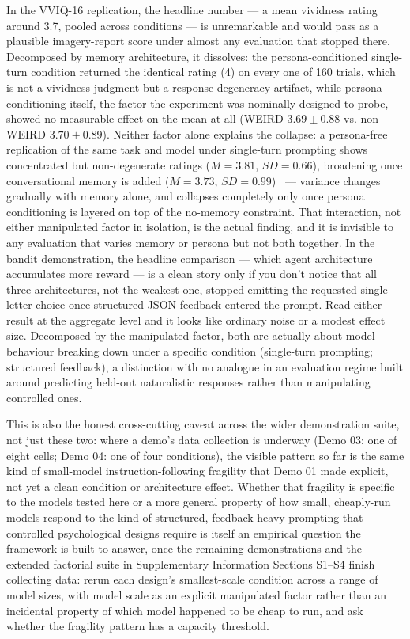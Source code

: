 \documentclass[11pt]{article}
\begin{document}
In the VVIQ-16 replication, the headline number — a mean vividness rating
around 3.7, pooled across conditions — is unremarkable and would pass as a
plausible imagery-report score under almost any evaluation that stopped
there. Decomposed by memory architecture, it dissolves: the
persona-conditioned single-turn condition returned the identical rating
(4) on every one of 160 trials, which is not a vividness judgment but a
response-degeneracy artifact, while persona conditioning itself, the
factor the experiment was nominally designed to probe, showed no
measurable effect on the mean at all (WEIRD $3.69\pm0.88$ vs.
non-WEIRD $3.70\pm0.89$). Neither factor alone explains the collapse: a
persona-free replication of the same task and model under single-turn
prompting shows concentrated but non-degenerate ratings
($M=3.81$, $SD=0.66$), broadening once conversational memory is added
($M=3.73$, $SD=0.99$)~\citep{ranjan2025psychological} — variance changes
gradually with memory alone, and collapses completely only once persona
conditioning is layered on top of the no-memory constraint. That
interaction, not either manipulated factor in isolation, is the actual
finding, and it is invisible to any evaluation that varies memory or
persona but not both together. In the bandit demonstration, the headline
comparison — which agent architecture accumulates more reward — is a clean
story only if you don't notice that all three architectures, not the
weakest one, stopped emitting the requested single-letter choice once
structured JSON feedback entered the prompt. Read either result at the
aggregate level and it looks like ordinary noise or a modest effect size.
Decomposed by the manipulated factor, both are actually about model
behaviour breaking down under a specific condition (single-turn prompting;
structured feedback), a distinction with no analogue in an evaluation
regime built around predicting held-out naturalistic responses rather than
manipulating controlled ones.

This is also the honest cross-cutting caveat across the wider demonstration
suite, not just these two: where a demo's data collection is underway
(Demo 03: one of eight cells; Demo 04: one of four conditions), the visible
pattern so far is the same kind of small-model instruction-following
fragility that Demo 01 made explicit, not yet a clean condition or
architecture effect. Whether that fragility is specific to the models
tested here or a more general property of how small, cheaply-run models
respond to the kind of structured, feedback-heavy prompting that
controlled psychological designs require is itself an empirical question
the framework is built to answer, once the remaining demonstrations and
the extended factorial suite in Supplementary Information Sections S1--S4
finish collecting data: rerun each design's smallest-scale condition across
a range of model sizes, with model scale as an explicit manipulated factor
rather than an incidental property of which model happened to be cheap to
run, and ask whether the fragility pattern has a capacity threshold.
\end{document}
